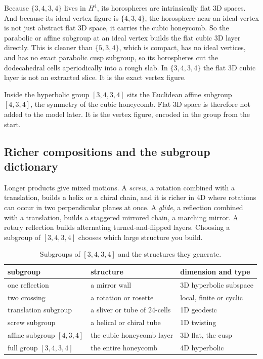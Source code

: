 Because $\{3,4,3,4\}$ lives in $H^4$, its horospheres are intrinsically flat 3D spaces. And because its ideal vertex figure is $\{4,3,4\}$, the horosphere near an ideal vertex is not just abstract flat 3D space, it carries the cubic honeycomb. So the parabolic or affine subgroup at an ideal vertex builds the flat cubic 3D layer directly. This is cleaner than $\{5,3,4\}$, which is compact, has no ideal vertices, and has no exact parabolic cusp subgroup, so its horospheres cut the dodecahedral cells aperiodically into a rough slab. In $\{3,4,3,4\}$ the flat 3D cubic layer is not an extracted slice. It is the exact vertex figure.

\begin{result}
Inside the hyperbolic group $[3,4,3,4]$ sits the Euclidean affine subgroup $[4,3,4]$, the symmetry of the cubic honeycomb. Flat 3D space is therefore not added to the model later. It is the vertex figure, encoded in the group from the start.
\end{result}

\subsection{Richer compositions and the subgroup dictionary}

Longer products give mixed motions. A \emph{screw}, a rotation combined with a translation, builds a helix or a chiral chain, and it is richer in 4D where rotations can occur in two perpendicular planes at once. A \emph{glide}, a reflection combined with a translation, builds a staggered mirrored chain, a marching mirror. A rotary reflection builds alternating turned-and-flipped layers. Choosing a subgroup of $[3,4,3,4]$ chooses which large structure you build.

\begin{table}[ht]
\centering
\begin{tabular}{@{}lll@{}}
\toprule
subgroup & structure & dimension and type \\
\midrule
one reflection & a mirror wall & 3D hyperbolic subspace \\
two crossing & a rotation or rosette & local, finite or cyclic \\
translation subgroup & a sliver or tube of $24$-cells & 1D geodesic \\
screw subgroup & a helical or chiral tube & 1D twisting \\
affine subgroup $[4,3,4]$ & the cubic honeycomb layer & 3D flat, the cusp \\
full group $[3,4,3,4]$ & the entire honeycomb & 4D hyperbolic \\
\bottomrule
\end{tabular}
\caption{Subgroups of $[3,4,3,4]$ and the structures they generate.}
\end{table}

